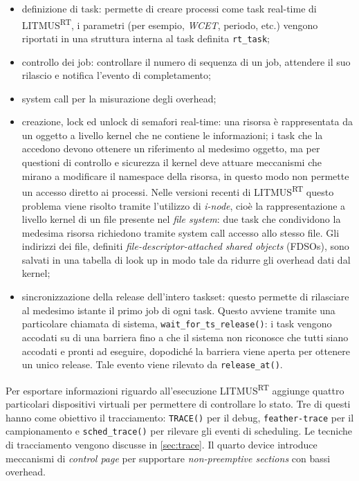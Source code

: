 \begin{appendices}
\begin{itemize}
	\item definizione di task: permette di creare processi come task real-time di LITMUS\textsuperscript{RT}, i parametri (per esempio, \textit{WCET}, periodo, etc.) vengono riportati in una struttura interna al task definita \texttt{rt\_task};
	\item controllo dei job: controllare il numero di sequenza di un job, attendere il suo rilascio e notifica l'evento di completamento;
	\item system call per la misurazione degli overhead;
	\item creazione, lock ed unlock di semafori real-time: una risorsa è rappresentata da un oggetto a livello kernel che ne contiene le informazioni; i task che la accedono devono ottenere un riferimento al medesimo oggetto, ma per questioni di controllo e sicurezza il kernel deve attuare meccanismi che mirano a modificare il namespace della risorsa, in questo modo non permette un accesso diretto ai processi. Nelle versioni recenti di LITMUS\textsuperscript{RT} questo problema viene risolto tramite l'utilizzo di \textit{i-node}, cioè la rappresentazione a livello kernel di un file presente nel \textit{file system}: due task che condividono la medesima risorsa richiedono tramite system call accesso allo stesso file. Gli indirizzi dei file, definiti \textit{file-descriptor-attached shared objects} (FDSOs), sono salvati in una tabella di look up in modo tale da ridurre gli overhead dati dal kernel;
	\item sincronizzazione della release dell'intero taskset: questo permette di rilasciare al medesimo istante il primo job di ogni task. Questo avviene tramite una particolare chiamata di sistema, \texttt{wait\_for\_ts\_release()}: i task vengono accodati su di una barriera fino a che il sistema non riconosce che tutti siano accodati e pronti ad eseguire, dopodiché la barriera viene aperta per ottenere un unico release. Tale evento viene rilevato da \texttt{release\_at()}.\\
\end{itemize}

Per esportare informazioni riguardo all'esecuzione LITMUS\textsuperscript{RT} aggiunge quattro particolari dispositivi virtuali per permettere di controllare lo stato. Tre di questi hanno come obiettivo il tracciamento: \texttt{TRACE()} per il debug, \texttt{feather-trace} per il campionamento e \texttt{sched\_trace()} per rilevare gli eventi di scheduling. Le tecniche di tracciamento vengono discusse in \ref{sec:trace}. Il quarto device introduce meccanismi di \textit{control page} per supportare \textit{non-preemptive sections} con bassi overhead.\\


\end{appendices}
